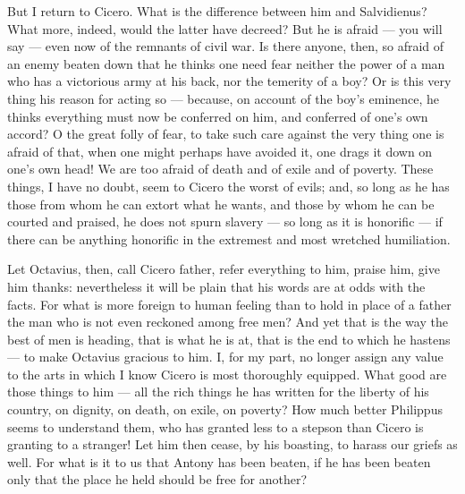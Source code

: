  But I return to Cicero. What is the difference between him and Salvidienus? What more, indeed, would the latter have decreed? But he is afraid --- you will say --- even now of the remnants of civil war. Is there anyone, then, so afraid of an enemy beaten down that he thinks one need fear neither the power of a man who has a victorious army at his back, nor the temerity of a boy? Or is this very thing his reason for acting so --- because, on account of the boy's eminence, he thinks everything must now be conferred on him, and conferred of one's own accord? O the great folly of fear, to take such care against the very thing one is afraid of that, when one might perhaps have avoided it, one drags it down on one's own head! We are too afraid of death and of exile and of poverty. These things, I have no doubt, seem to Cicero the worst of evils; and, so long as he has those from whom he can extort what he wants, and those by whom he can be courted and praised, he does not spurn slavery --- so long as it is honorific --- if there can be anything honorific in the extremest and most wretched humiliation.

 Let Octavius, then, call Cicero father, refer everything to him, praise him, give him thanks: nevertheless it will be plain that his words are at odds with the facts. For what is more foreign to human feeling than to hold in place of a father the man who is not even reckoned among free men? And yet that is the way the best of men is heading, that is what he is at, that is the end to which he hastens --- to make Octavius gracious to him. I, for my part, no longer assign any value to the arts in which I know Cicero is most thoroughly equipped. What good are those things to him --- all the rich things he has written for the liberty of his country, on dignity, on death, on exile, on poverty? How much better Philippus seems to understand them, who has granted less to a stepson than Cicero is granting to a stranger! Let him then cease, by his boasting, to harass our griefs as well. For what is it to us that Antony has been beaten, if he has been beaten only that the place he held should be free for another?

